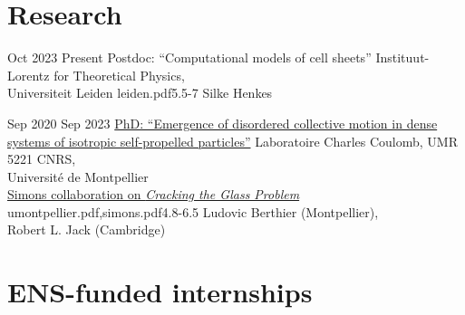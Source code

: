 \documentclass[a4paper]{cvtemplate_en} %
\begin{document}
\makeprofile %


\vspace{2mm}
\section{Research}

\begin{cvbody}

\cvitem
	{Oct 2023}
	{Present}
  {Postdoc: ``Computational models of cell sheets''}
  {Instituut-Lorentz for Theoretical Physics,\\ Universiteit Leiden }
  {leiden.pdf}{5.5}{-7}
	{Silke Henkes}
  {\\}

\cvitem
	{Sep 2020}
	{Sep 2023}
  {\href{https://theses.hal.science/tel-04530690v1}{PhD: ``Emergence of disordered collective motion in dense systems of isotropic self-propelled particles''}}
  {Laboratoire Charles Coulomb, UMR 5221 CNRS,\\ Universit\'e de Montpellier \\
  \href{https://scglass.uchicago.edu}{Simons collaboration on \textit{Cracking the Glass Problem}}}
  {umontpellier.pdf,simons.pdf}{4.8}{-6.5}
	{Ludovic Berthier (Montpellier),\\ Robert L. Jack (Cambridge)}
  {\\}

\end{cvbody}

\section{ENS-funded internships}
\end{document}
